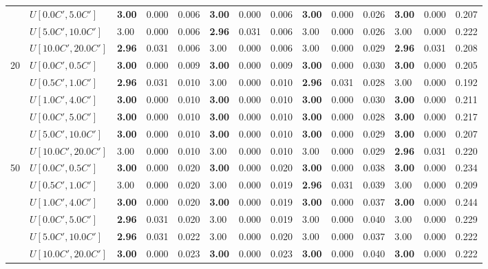 \begin{table}[h]
{\begin{tabular}{|l|l||l|l|l||l|l|l||l|l|l||l|l|l|}
       & $U[0.0C',5.0C']$ & \textbf{3.00} & 0.000 & 0.006 & \textbf{3.00} & 0.000 & 0.006 & \textbf{3.00} & 0.000 & 0.026 & \textbf{3.00} & 0.000 & 0.207 \\
       & $U[5.0C',10.0C']$ & 3.00 & 0.000 & 0.006 & \textbf{2.96} & 0.031 & 0.006 & 3.00 & 0.000 & 0.026 & 3.00 & 0.000 & 0.222 \\
       & $U[10.0C',20.0C']$ & \textbf{2.96} & 0.031 & 0.006 & 3.00 & 0.000 & 0.006 & 3.00 & 0.000 & 0.029 & \textbf{2.96} & 0.031 & 0.208 \\
      \hline\hline
      \multirow{6}{*}{20} & $U[0.0C',0.5C']$ & \textbf{3.00} & 0.000 & 0.009 & \textbf{3.00} & 0.000 & 0.009 & \textbf{3.00} & 0.000 & 0.030 & \textbf{3.00} & 0.000 & 0.205 \\
       & $U[0.5C',1.0C']$ & \textbf{2.96} & 0.031 & 0.010 & 3.00 & 0.000 & 0.010 & \textbf{2.96} & 0.031 & 0.028 & 3.00 & 0.000 & 0.192 \\
       & $U[1.0C',4.0C']$ & \textbf{3.00} & 0.000 & 0.010 & \textbf{3.00} & 0.000 & 0.010 & \textbf{3.00} & 0.000 & 0.030 & \textbf{3.00} & 0.000 & 0.211 \\
       & $U[0.0C',5.0C']$ & \textbf{3.00} & 0.000 & 0.010 & \textbf{3.00} & 0.000 & 0.010 & \textbf{3.00} & 0.000 & 0.028 & \textbf{3.00} & 0.000 & 0.217 \\
       & $U[5.0C',10.0C']$ & \textbf{3.00} & 0.000 & 0.010 & \textbf{3.00} & 0.000 & 0.010 & \textbf{3.00} & 0.000 & 0.029 & \textbf{3.00} & 0.000 & 0.207 \\
       & $U[10.0C',20.0C']$ & 3.00 & 0.000 & 0.010 & 3.00 & 0.000 & 0.010 & 3.00 & 0.000 & 0.029 & \textbf{2.96} & 0.031 & 0.220 \\
      \hline\hline
      \multirow{6}{*}{50} & $U[0.0C',0.5C']$ & \textbf{3.00} & 0.000 & 0.020 & \textbf{3.00} & 0.000 & 0.020 & \textbf{3.00} & 0.000 & 0.038 & \textbf{3.00} & 0.000 & 0.234 \\
       & $U[0.5C',1.0C']$ & 3.00 & 0.000 & 0.020 & 3.00 & 0.000 & 0.019 & \textbf{2.96} & 0.031 & 0.039 & 3.00 & 0.000 & 0.209 \\
       & $U[1.0C',4.0C']$ & \textbf{3.00} & 0.000 & 0.020 & \textbf{3.00} & 0.000 & 0.019 & \textbf{3.00} & 0.000 & 0.037 & \textbf{3.00} & 0.000 & 0.244 \\
       & $U[0.0C',5.0C']$ & \textbf{2.96} & 0.031 & 0.020 & 3.00 & 0.000 & 0.019 & 3.00 & 0.000 & 0.040 & 3.00 & 0.000 & 0.229 \\
       & $U[5.0C',10.0C']$ & \textbf{2.96} & 0.031 & 0.022 & 3.00 & 0.000 & 0.020 & 3.00 & 0.000 & 0.037 & 3.00 & 0.000 & 0.222 \\
       & $U[10.0C',20.0C']$ & \textbf{3.00} & 0.000 & 0.023 & \textbf{3.00} & 0.000 & 0.023 & \textbf{3.00} & 0.000 & 0.040 & \textbf{3.00} & 0.000 & 0.222 \\
      \hline
      \end{tabular}
      }
      \label{tab:pcpn90p1}
	  \end{table}
      
